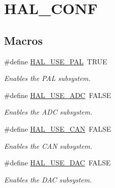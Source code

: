 \hypertarget{group__HAL__CONF}{}\section{H\+A\+L\+\_\+\+C\+O\+NF}
\label{group__HAL__CONF}
\subsection*{Macros}
\begin{DoxyCompactItemize}
\item 
\hypertarget{group__HAL__CONF_ga2311bcc7b41bfba183c9ec1a64a11e93}{}\label{group__HAL__CONF_ga2311bcc7b41bfba183c9ec1a64a11e93} 
\#define \hyperlink{group__HAL__CONF_ga2311bcc7b41bfba183c9ec1a64a11e93}{H\+A\+L\+\_\+\+U\+S\+E\+\_\+\+P\+AL}~T\+R\+UE
\begin{DoxyCompactList}\small\item\em Enables the P\+AL subsystem. \end{DoxyCompactList}\item 
\hypertarget{group__HAL__CONF_ga413a1b6c0ca2c9e524df50ceac1275fd}{}\label{group__HAL__CONF_ga413a1b6c0ca2c9e524df50ceac1275fd} 
\#define \hyperlink{group__HAL__CONF_ga413a1b6c0ca2c9e524df50ceac1275fd}{H\+A\+L\+\_\+\+U\+S\+E\+\_\+\+A\+DC}~F\+A\+L\+SE
\begin{DoxyCompactList}\small\item\em Enables the A\+DC subsystem. \end{DoxyCompactList}\item 
\hypertarget{group__HAL__CONF_ga2e351185eace5acfd90b65c9fe796355}{}\label{group__HAL__CONF_ga2e351185eace5acfd90b65c9fe796355} 
\#define \hyperlink{group__HAL__CONF_ga2e351185eace5acfd90b65c9fe796355}{H\+A\+L\+\_\+\+U\+S\+E\+\_\+\+C\+AN}~F\+A\+L\+SE
\begin{DoxyCompactList}\small\item\em Enables the C\+AN subsystem. \end{DoxyCompactList}\item 
\hypertarget{group__HAL__CONF_gafa9dbe1932df28930e9cfff6000b43d6}{}\label{group__HAL__CONF_gafa9dbe1932df28930e9cfff6000b43d6} 
\#define \hyperlink{group__HAL__CONF_gafa9dbe1932df28930e9cfff6000b43d6}{H\+A\+L\+\_\+\+U\+S\+E\+\_\+\+D\+AC}~F\+A\+L\+SE
\begin{DoxyCompactList}\small\item\em Enables the D\+AC subsystem. \end{DoxyCompactList}\item 

\end{DoxyCompactItemize}
